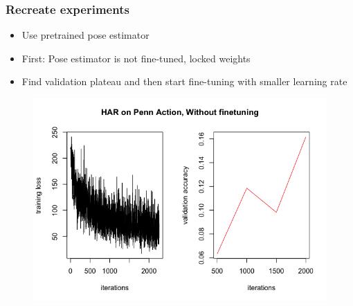 \documentclass[9pt]{beamer}
\newenvironment{myframe}[1][]{%
\begin{frame}%
\frametitle{#1}
\setcounter{footnote}{0}


}{%
\end{frame}%
}
\begin{document}
\begin{myframe}[Recreate experiments]
    \begin{itemize}
        \item Use pretrained pose estimator
        \item First: Pose estimator is not fine-tuned, locked weights
        \item Find validation plateau and then start fine-tuning with smaller learning rate
    \end{itemize}
    \begin{figure}
        \includegraphics[height=.60\textheight]{presentation_har_pennaction.png}
        \centering
    \end{figure}    

\end{myframe}
\end{document}
